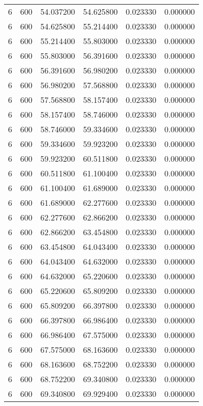 \begin{longtable}{rrrrrr}
6 & 600 & 54.037200 & 54.625800 & 0.023330 & 0.000000 \\
6 & 600 & 54.625800 & 55.214400 & 0.023330 & 0.000000 \\
6 & 600 & 55.214400 & 55.803000 & 0.023330 & 0.000000 \\
6 & 600 & 55.803000 & 56.391600 & 0.023330 & 0.000000 \\
6 & 600 & 56.391600 & 56.980200 & 0.023330 & 0.000000 \\
6 & 600 & 56.980200 & 57.568800 & 0.023330 & 0.000000 \\
6 & 600 & 57.568800 & 58.157400 & 0.023330 & 0.000000 \\
6 & 600 & 58.157400 & 58.746000 & 0.023330 & 0.000000 \\
6 & 600 & 58.746000 & 59.334600 & 0.023330 & 0.000000 \\
6 & 600 & 59.334600 & 59.923200 & 0.023330 & 0.000000 \\
6 & 600 & 59.923200 & 60.511800 & 0.023330 & 0.000000 \\
6 & 600 & 60.511800 & 61.100400 & 0.023330 & 0.000000 \\
6 & 600 & 61.100400 & 61.689000 & 0.023330 & 0.000000 \\
6 & 600 & 61.689000 & 62.277600 & 0.023330 & 0.000000 \\
6 & 600 & 62.277600 & 62.866200 & 0.023330 & 0.000000 \\
6 & 600 & 62.866200 & 63.454800 & 0.023330 & 0.000000 \\
6 & 600 & 63.454800 & 64.043400 & 0.023330 & 0.000000 \\
6 & 600 & 64.043400 & 64.632000 & 0.023330 & 0.000000 \\
6 & 600 & 64.632000 & 65.220600 & 0.023330 & 0.000000 \\
6 & 600 & 65.220600 & 65.809200 & 0.023330 & 0.000000 \\
6 & 600 & 65.809200 & 66.397800 & 0.023330 & 0.000000 \\
6 & 600 & 66.397800 & 66.986400 & 0.023330 & 0.000000 \\
6 & 600 & 66.986400 & 67.575000 & 0.023330 & 0.000000 \\
6 & 600 & 67.575000 & 68.163600 & 0.023330 & 0.000000 \\
6 & 600 & 68.163600 & 68.752200 & 0.023330 & 0.000000 \\
6 & 600 & 68.752200 & 69.340800 & 0.023330 & 0.000000 \\
6 & 600 & 69.340800 & 69.929400 & 0.023330 & 0.000000 \\

\end{longtable}

